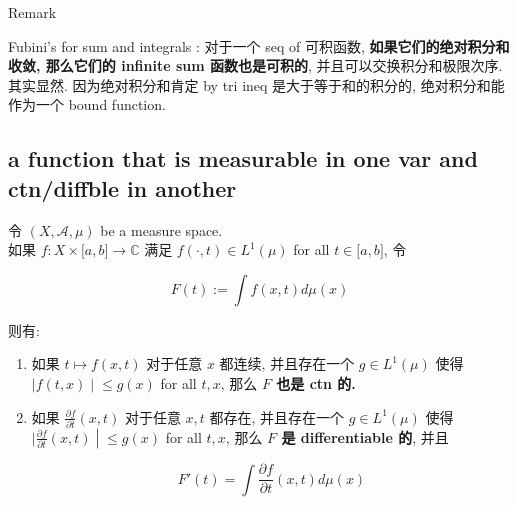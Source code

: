 \begin{qlremark}{Remark}

Fubini's for sum and integrals : 对于一个 seq of 可积函数, \textbf{如果它们的绝对积分和收敛, 那么它们的 infinite sum 函数也是可积的}, 并且可以交换积分和极限次序.\\
其实显然. 因为绝对积分和肯定 by tri ineq 是大于等于和的积分的, 绝对积分和能作为一个 bound function.

\end{qlremark}

\subsection{a function that is measurable in one var and ctn/diffble in another}\label{a-function-that-is-measurable-in-one-var-and-ctndiffble-in-another}

\begin{corollary}

令 \((X,\mathcal{A},\mu)\) be a measure space.\\
如果 \(f:X \times \lbrack a,b\rbrack\rightarrow\mathbb{C}\) 满足 \(f( \cdot ,t) \in L^{1}(\mu)\) for all \(t \in \lbrack a,b\rbrack\), 令

\[F(t) := \int f(x,t) d\mu(x)\]

则有:

\begin{enumerate}
\item
  如果 \(t\mapsto f(x,t)\) 对于任意 \(x\) 都连续, 并且存在一个 \(g \in L^{1}(\mu)\) 使得 \(\left. |f(t,x) \middle| \leq g(x) \right.\) for all \(t,x\), 那么 \textbf{\(F\) 也是 ctn 的.}
\item
  如果 \(\frac{\partial f}{\partial t}(x,t)\) 对于任意 \(x,t\) 都存在, 并且存在一个 \(g \in L^{1}(\mu)\) 使得 \(\left. |\frac{\partial f}{\partial t}(x,t) \middle| \leq g(x) \right.\) for all \(t,x\), 那么 \textbf{\(F\) 是 differentiable 的}, 并且

  \[F'(t) = \int\frac{\partial f}{\partial t}(x,t) d\mu(x)\]
\end{enumerate}

\end{corollary}

